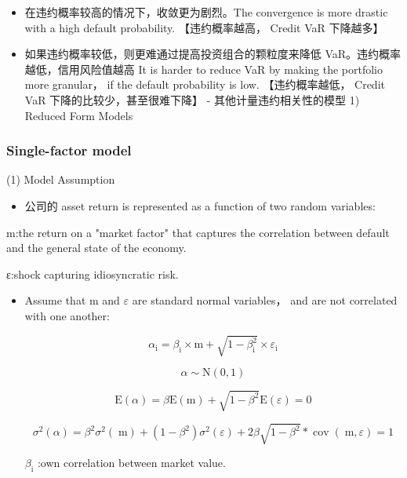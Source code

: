 \begin{itemize}
\begin{itemize}
\item 在违约概率较高的情况下，收敛更为剧烈。The convergence is more drastic with a high default probability. 【违约概率越高， Credit VaR 下降越多】

\item 如果违约概率较低，则更难通过提高投资组合的颗粒度来降低 VaR。违约概率越低，信用风险值越高 It is harder to reduce VaR by making the portfolio more granular， if the default probability is low. 【违约概率越低， Credit VaR 下降的比较少，甚至很难下降】 - 其他计量违约相关性的模型 1) Reduced Form Models


\end{itemize}

\end{itemize}



\subsubsection{Single-factor model}

(1) Model Assumption

\begin{itemize}
\item 公司的 asset return is represented as a function of two random variables:
\end{itemize}

 m:the return on a "market factor" that captures the correlation between default and the general state of the economy.

 ε:shock capturing idiosyncratic risk.

\begin{itemize}
\item Assume that \(\mathrm{m}\) and \(\varepsilon\) are standard normal variables， and are not correlated with one another:

\[
{\alpha }_{\mathrm{i}} = {\beta }_{\mathrm{i}} \times  \mathrm{m} + \sqrt{1 - {\beta }_{\mathrm{i}}^{2}} \times  {\varepsilon }_{\mathrm{i}}
\]

\[
\alpha  \sim  \mathrm{N}\left( {0,1}\right)
\]

\[
\mathrm{E}\left( \alpha \right)  = \beta \mathrm{E}\left( \mathrm{m}\right)  + \sqrt{1 - {\beta }^{2}}\mathrm{E}\left( \varepsilon \right)  = 0
\]

\[
{\sigma }^{2}\left( \alpha \right)  = {\beta }^{2}{\sigma }^{2}\left( \mathrm{\;m}\right)  + \left( {1 - {\beta }^{2}}\right) {\sigma }^{2}\left( \varepsilon \right)  + {2\beta }\sqrt{1 - {\beta }^{2}} * \operatorname{cov}\left( {\mathrm{\;m},\varepsilon }\right)  = 1
\]

 \({\beta }_{\mathrm{i}}\) :own correlation between market value.

\end{itemize}


